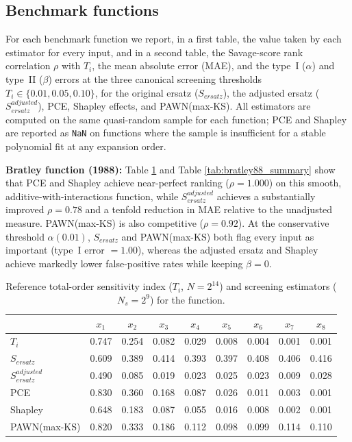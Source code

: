 \documentclass[12pt]{article}
\begin{document}
\subsection{Benchmark functions}
\label{Benchmark}

For each benchmark function we report, in a first table, the value taken by each estimator for every input, and in a second table, the Savage-score rank correlation $\rho$ with $T_i$, the mean absolute error (MAE), and the type~I ($\alpha$) and type~II ($\beta$) errors at the three canonical screening thresholds $T_i\in\{0.01,0.05,0.10\}$, for the original ersatz ($S_{ersatz}$), the adjusted ersatz ($S^{adjusted}_{ersatz}$), PCE, Shapley effects, and PAWN(max-KS). All estimators are computed on the same quasi-random sample for each function; PCE and Shapley are reported as \texttt{NaN} on functions where the sample is insufficient for a stable polynomial fit at any expansion order.

\textbf{Bratley function (1988):} Table \ref{tab:bratley88_function}  and Table \ref{tab:bratley88_summary} show that PCE and Shapley achieve near-perfect ranking ($\rho=1.000$) on this smooth, additive-with-interactions function, while $S^{adjusted}_{ersatz}$ achieves a substantially improved $\rho=0.78$ and a tenfold reduction in MAE relative to the unadjusted measure. PAWN(max-KS) is also competitive ($\rho=0.92$). At the conservative threshold $\alpha(0.01)$, $S_{ersatz}$ and PAWN(max-KS) both flag every input as important (type~I error $=1.00$), whereas the adjusted ersatz and Shapley achieve markedly lower false-positive rates while keeping $\beta=0$.

\begin{table}[H]
\centering
\begin{tabular}{@{}lcccccccc@{}} \toprule
 & $x_1$ & $x_2$ & $x_3$ & $x_4$ & $x_5$ & $x_6$ & $x_7$ & $x_8$ \\ \midrule
$T_i$                   & 0.747 & 0.254 & 0.082 & 0.029 & 0.008 & 0.004 & 0.001 & 0.001 \\
$S_{ersatz}$            & 0.609 & 0.389 & 0.414 & 0.393 & 0.397 & 0.408 & 0.406 & 0.416 \\
$S^{adjusted}_{ersatz}$ & 0.490 & 0.085 & 0.019 & 0.023 & 0.025 & 0.023 & 0.009 & 0.028 \\
PCE                     & 0.830 & 0.360 & 0.168 & 0.087 & 0.026 & 0.011 & 0.003 & 0.001 \\
Shapley                 & 0.648 & 0.183 & 0.087 & 0.055 & 0.016 & 0.008 & 0.002 & 0.001 \\
PAWN(max-KS)            & 0.820 & 0.333 & 0.186 & 0.112 & 0.098 & 0.099 & 0.114 & 0.110 \\ \bottomrule
\end{tabular}
\caption{Reference total-order sensitivity index ($T_i$, $N=2^{14}$) and screening estimators ($N_s=2^9$) for the \cite{bratley1988algorithm} function.}
\label{tab:bratley88_function}
\end{table}
\end{document}
